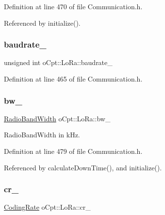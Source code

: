 Definition at line 470 of file Communication.\+h.



Referenced by initialize().

\hypertarget{classo_cpt_1_1_lo_ra_a076f477e2096b2a49c8d4c25b79b1143}{}\label{classo_cpt_1_1_lo_ra_a076f477e2096b2a49c8d4c25b79b1143} 
\subsubsection{\texorpdfstring{baudrate\+\_\+}{baudrate\_}}
{\footnotesize\ttfamily unsigned int o\+Cpt\+::\+Lo\+Ra\+::baudrate\+\_\+\hspace{0.3cm}{\ttfamily [protected]}}



Definition at line 465 of file Communication.\+h.

\hypertarget{classo_cpt_1_1_lo_ra_a687ca4712f0976534dcdaec0b068d9e5}{}\label{classo_cpt_1_1_lo_ra_a687ca4712f0976534dcdaec0b068d9e5} 
\subsubsection{\texorpdfstring{bw\+\_\+}{bw\_}}
{\footnotesize\ttfamily \hyperlink{classo_cpt_1_1_lo_ra_a37ef012dc7d97a8825917dc84ddc6f4c}{Radio\+Band\+Width} o\+Cpt\+::\+Lo\+Ra\+::bw\+\_\+\hspace{0.3cm}{\ttfamily [protected]}}



Radio\+Band\+Width in k\+Hz. 



Definition at line 479 of file Communication.\+h.



Referenced by calculate\+Down\+Time(), and initialize().

\hypertarget{classo_cpt_1_1_lo_ra_a61d7ff909c4e40b48a8722ec0e608b2a}{}\label{classo_cpt_1_1_lo_ra_a61d7ff909c4e40b48a8722ec0e608b2a} 
\subsubsection{\texorpdfstring{cr\+\_\+}{cr\_}}
{\footnotesize\ttfamily \hyperlink{classo_cpt_1_1_lo_ra_a9bbdbc3b6fefdabd52bbb3ebbebcee7a}{Coding\+Rate} o\+Cpt\+::\+Lo\+Ra\+::cr\+\_\+\hspace{0.3cm}{\ttfamily [protected]}}



